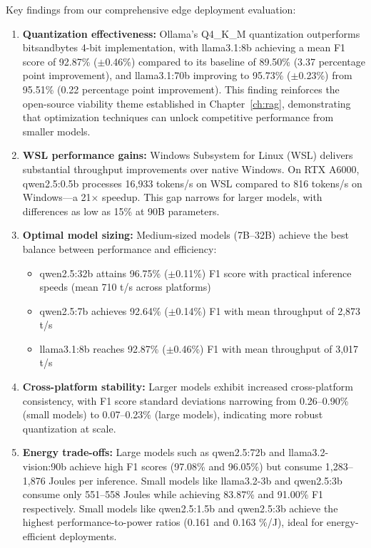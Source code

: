 Key findings from our comprehensive edge deployment evaluation:

\begin{enumerate}[leftmargin=*]
    \item \textbf{Quantization effectiveness:} Ollama's Q4\_K\_M quantization outperforms bitsandbytes 4-bit implementation, with llama3.1:8b achieving a mean F1 score of 92.87\% ($\pm$0.46\%) compared to its baseline of 89.50\% (3.37 percentage point improvement), and llama3.1:70b improving to 95.73\% ($\pm$0.23\%) from 95.51\% (0.22 percentage point improvement). This finding reinforces the open-source viability theme established in Chapter~\ref{ch:rag}, demonstrating that optimization techniques can unlock competitive performance from smaller models.
    
    \item \textbf{WSL performance gains:} Windows Subsystem for Linux (WSL) delivers substantial throughput improvements over native Windows. On RTX A6000, qwen2.5:0.5b processes 16,933 tokens/s on WSL compared to 816 tokens/s on Windows---a 21$\times$ speedup. This gap narrows for larger models, with differences as low as 15\% at 90B parameters.
    
    \item \textbf{Optimal model sizing:} Medium-sized models (7B--32B) achieve the best balance between performance and efficiency:
    \begin{itemize}
        \item qwen2.5:32b attains 96.75\% ($\pm$0.11\%) F1 score with practical inference speeds (mean 710 t/s across platforms)
        \item qwen2.5:7b achieves 92.64\% ($\pm$0.14\%) F1 with mean throughput of 2,873 t/s
        \item llama3.1:8b reaches 92.87\% ($\pm$0.46\%) F1 with mean throughput of 3,017 t/s
    \end{itemize}
    
    \item \textbf{Cross-platform stability:} Larger models exhibit increased cross-platform consistency, with F1 score standard deviations narrowing from 0.26--0.90\% (small models) to 0.07--0.23\% (large models), indicating more robust quantization at scale.
    
    \item \textbf{Energy trade-offs:} Large models such as qwen2.5:72b and llama3.2-vision:90b achieve high F1 scores (97.08\% and 96.05\%) but consume 1,283--1,876 Joules per inference. Small models like llama3.2-3b and qwen2.5:3b consume only 551--558 Joules while achieving 83.87\% and 91.00\% F1 respectively. Small models like qwen2.5:1.5b and qwen2.5:3b achieve the highest performance-to-power ratios (0.161 and 0.163 \%/J), ideal for energy-efficient deployments.
\end{enumerate}

